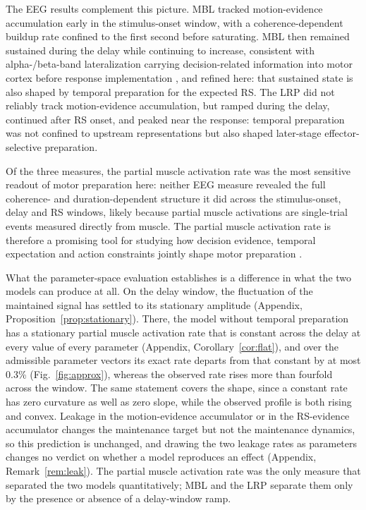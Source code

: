 \documentclass[a4paper,11pt]{article}
\theoremstyle{definition}
\newcommand{\1}{\mathbbm{1}}
\begin{document}
The EEG results complement this picture. MBL tracked motion-evidence accumulation early in the stimulus-onset window, with a coherence-dependent buildup rate confined to the first second before saturating. MBL then remained sustained during the delay while continuing to increase, consistent with alpha-/beta-band lateralization carrying decision-related information into motor cortex before response implementation \parencites{roggeMotorCorticalSignals2022}{twomeyAbstractEffectorSelectiveDecision2016}, and refined here: that sustained state is also shaped by temporal preparation for the expected RS. The LRP did not reliably track motion-evidence accumulation, but ramped during the delay, continued after RS onset, and peaked near the response: temporal preparation was not confined to upstream representations but also shaped later-stage effector-selective preparation.

Of the three measures, the partial muscle activation rate was the most sensitive readout of motor preparation here: neither EEG measure revealed the full coherence- and duration-dependent structure it did across the stimulus-onset, delay and RS windows, likely because partial muscle activations are single-trial events measured directly from muscle. The partial muscle activation rate is therefore a promising tool for studying how decision evidence, temporal expectation and action constraints jointly shape motor preparation \parencites{balsdonSecondaryMotorIntegration2023}{dendauwGatedCascadeDiffusion2024}{ramayyaHumanResponseTimes2025}{roggeMotorCorticalSignals2022}{servantIntegratedTheoryDeciding2021}.

What the parameter-space evaluation establishes is a difference in what the two models can produce at all. On the delay window, the fluctuation of the maintained signal has settled to its stationary amplitude (Appendix, Proposition~\ref{prop:stationary}). There, the model without temporal preparation has a stationary partial muscle activation rate that is constant across the delay at every value of every parameter (Appendix, Corollary~\ref{cor:flat}), and over the admissible parameter vectors its exact rate departs from that constant by at most 0.3\% (Fig.~\ref{fig:approx}), whereas the observed rate rises more than fourfold across the window. The same statement covers the shape, since a constant rate has zero curvature as well as zero slope, while the observed profile is both rising and convex. Leakage in the motion-evidence accumulator or in the RS-evidence accumulator changes the maintenance target but not the maintenance dynamics, so this prediction is unchanged, and drawing the two leakage rates as parameters changes no verdict on whether a model reproduces an effect (Appendix, Remark~\ref{rem:leak}). The partial muscle activation rate was the only measure that separated the two models quantitatively; MBL and the LRP separate them only by the presence or absence of a delay-window ramp.
\end{document}

